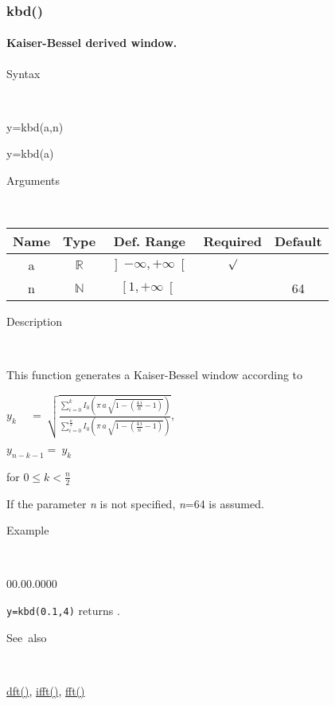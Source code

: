 \newpage
\subsubsection*{\hypertarget{kbd}{}{\Large kbd()}}


\paragraph{\label{par:Kaiser-Bessel-window}Kaiser-Bessel derived window.}

\begin{description}
\item [Syntax]~
\end{description}
y=kbd(a,n)

\noindent y=kbd(a)

\begin{description}
\item [Arguments]~
\end{description}
\begin{tabular}{|c|c|c|c|c|}
\hline 
Name&
Type&
Def. Range&
Required&
Default\tabularnewline
\hline
\hline 
a&
$\mathbb{R}$&
$\left]-\infty,+\infty\right[$&
$\surd$&
\tabularnewline
\hline 
n&
$\mathbb{N}$&
$\left[1,+\infty\right[$&
&
64\tabularnewline
\hline
\end{tabular}

\begin{description}
\item [Description]~
\end{description}
This function generates a Kaiser-Bessel window according to

\medskip{}
$y_{k}\quad\,=\:{\displaystyle \sqrt{\frac{\sum\limits _{i=0}^{k}I_{0}\left(\pi\, a\,\sqrt{1-\left(\frac{4\, i}{n}-1\right)}\right)}{\sum\limits _{i=0}^{\frac{n}{2}}I_{0}\left(\pi\, a\,\sqrt{1-\left(\frac{4\, i}{n}-1\right)}\right)}}}$,
\medskip{}

$y_{n-k-1}=\: y_{k}$
\medskip{}

for $0\leq k<\frac{n}{2}$
\medskip{}

\noindent If the parameter \textit{n} is not specified, \textit{n}=64
is assumed.

\begin{description}
\item [Example]~
\end{description}
\begin{lyxlist}{00.00.0000}
\item [\texttt{y=kbd(0.1,4)}]returns .
\end{lyxlist}
\begin{description}
\item [See~also]~
\end{description}
\textcolor{blue}{\hyperlink{dft}{dft()}}\textcolor{black}{,} \textcolor{blue}{\hyperlink{ifft}{ifft()}}\textcolor{black}{,}
\textcolor{blue}{\hyperlink{fft}{fft()}}
